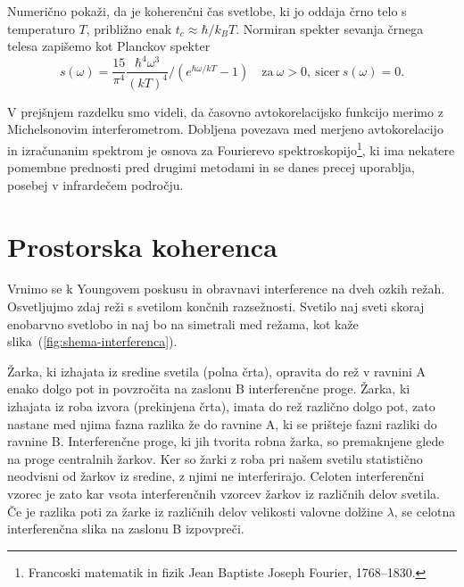\begin{definition}\label{naloga-Planck}
Numerično pokaži, da je koherenčni čas svetlobe, ki jo oddaja črno telo s 
temperaturo $T$, približno enak $t_{c}\approx{\hbar}/{k_{B}T}$.
Normiran spekter sevanja črnega telesa zapišemo 
kot Planckov spekter 
\begin{equation}
s(\omega)=\frac{15}{\pi^{4}} \frac{\hbar^4\omega^3}{(kT)^4}/\left(e^{\hbar\omega/kT}-1\right)
\quad \textrm{za}~\omega >0,~\textrm{sicer}~s(\omega) = 0.
\label{eq:Planckov-spekter}
\end{equation}
\end{definition}

\begin{remark}
V prejšnjem razdelku smo videli, da časovno avtokorelacijsko funkcijo
merimo z Michelsonovim interferometrom. Dobljena povezava med merjeno
avtokorelacijo in izračunanim spektrom je osnova za Fourierevo 
spektroskopijo\footnote{Francoski matematik in fizik Jean Baptiste Joseph Fourier, 1768--1830.},
ki ima nekatere pomembne prednosti pred drugimi metodami in se danes
precej uporablja, posebej v infrardečem področju.
\end{remark}

\section{Prostorska koherenca}
\label{Prostorska-koherenca}
Vrnimo se k Youngovem poskusu in obravnavi interference
 na dveh ozkih režah. 
Osvetljujmo zdaj reži s svetilom končnih razsežnosti. Svetilo naj sveti skoraj enobarvno
svetlobo in naj bo na simetrali med režama, kot kaže slika~(\ref{fig:shema-interferenca}).

Žarka, ki izhajata iz sredine svetila (polna črta), 
opravita do rež v ravnini A enako dolgo pot in povzročita na zaslonu B 
interferenčne proge. Žarka, ki izhajata iz roba izvora (prekinjena črta), 
imata do rež različno dolgo pot, zato nastane med njima fazna razlika že do ravnine A, 
ki se prišteje fazni razliki do ravnine B. Interferenčne proge, ki jih tvorita 
robna žarka, so premaknjene glede na proge centralnih žarkov. Ker so žarki z roba
pri našem svetilu statistično neodvisni od žarkov iz sredine, z njimi
ne interferirajo. Celoten interferenčni vzorec je zato kar vsota interferenčnih
vzorcev žarkov iz različnih delov svetila. Če je razlika poti za žarke
iz različnih delov velikosti valovne dolžine $\lambda$, se celotna
interferenčna slika na zaslonu B izpovpreči.

